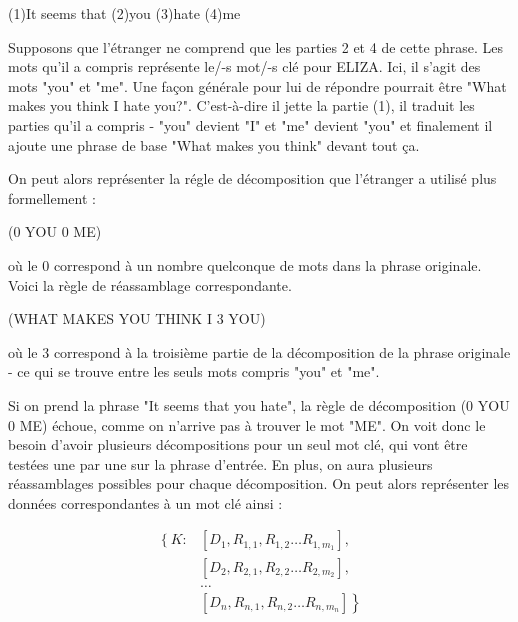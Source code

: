 \documentclass[11pt, a4paper]{report}
\begin{document}
  \begin{center}
    (1)It seems that (2)you (3)hate (4)me
  \end{center} 
  
  Supposons que l'étranger ne comprend que les parties 2 et 4 de cette phrase. Les mots qu'il a compris 
  représente le/-s mot/-s clé pour ELIZA. Ici, il s'agit des mots "you" et "me". Une façon générale 
  pour lui de répondre pourrait être "What makes you think I hate you?". C'est-à-dire il jette la partie (1), 
  il traduit les parties qu'il a compris - "you" devient "I" et "me" devient "you" et finalement il 
  ajoute une phrase de base "What makes you think" devant tout ça. 

  On peut alors représenter la régle de décomposition que l'étranger a utilisé plus formellement :

  \begin{center}
    (0 YOU 0 ME)
  \end{center} 

  où le 0 correspond à un nombre quelconque de mots dans la phrase originale. 
  Voici la règle de réassamblage correspondante.

  \begin{center}
    (WHAT MAKES YOU THINK I 3 YOU)
  \end{center} 
  
  où le 3 correspond à la troisième partie de la décomposition de la phrase originale 
  - ce qui se trouve entre les seuls mots compris "you" et "me". 
   
  Si on prend la phrase "It seems that you hate", la règle de décomposition 
  (0 YOU 0 ME) échoue, comme on n'arrive pas à trouver le mot "ME". On voit donc le 
  besoin d'avoir plusieurs décompositions pour un seul mot clé, qui vont être testées 
  une par une sur la phrase d'entrée. En plus, on aura plusieurs réassamblages possibles pour 
  chaque décomposition. On peut alors représenter les données correspondantes à un mot clé 
  ainsi : 

  \begin{align*}
    \left\{ K: \right. 
    &\left[ D_{1}, R_{1, 1}, R_{1, 2} \ldots R_{1, m_{1}} \right], \\
    &\left[ D_{2}, R_{2, 1}, R_{2, 2} \ldots R_{2, m_{2}} \right], \\
    &\ldots \\
    &\left. \left[ D_{n}, R_{n, 1}, R_{n, 2} \ldots R_{n, m_{n}} \right] \right\}
  \end{align*}
\end{document}
